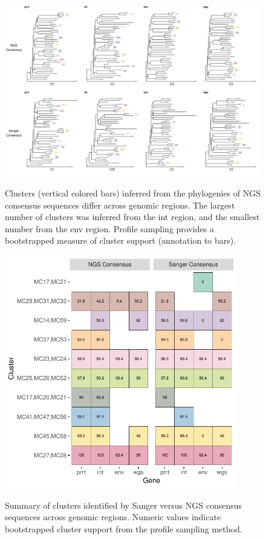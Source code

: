 \documentclass[letterpaper]{article}
\begin{document}
\begin{figure}[p!]
	\caption{Clusters (vertical colored bars) inferred from the phylogenies of NGS consensus sequences differ across genomic regions. The largest number of clusters was inferred from the int region, and the smallest number from the env region. Profile sampling provides a bootstrapped measure of cluster support (annotation to bars).}
	\centering
	\includegraphics[width=\linewidth]{Figure4}
	\label{fig4}
\end{figure}

%

\begin{figure}[p!]
	\caption{Summary of clusters identified by Sanger versus NGS consensus sequences across genomic regions. Numeric values indicate bootstrapped cluster support from the profile sampling method.}
	\centering
	\includegraphics[width=4in]{Figure5}
	\label{fig5}
\end{figure}
\end{document}
